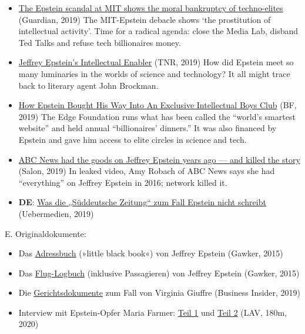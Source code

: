 \begin{itemize}
\tightlist
\item
  \href{https://www.theguardian.com/commentisfree/2019/sep/07/jeffrey-epstein-mit-funding-tech-intellectuals}{The
  Epstein scandal at MIT shows the moral bankruptcy of techno-elites}
  (Guardian, 2019) The MIT-Epstein debacle shows `the prostitution of
  intellectual activity'. Time for a radical agenda: close the Media
  Lab, disband Ted Talks and refuse tech billionaires money.
\item
  \href{https://newrepublic.com/article/154826/jeffrey-epsteins-intellectual-enabler}{Jeffrey
  Epstein's Intellectual Enabler} (TNR, 2019) How did Epstein meet so
  many luminaries in the worlds of science and technology? It all might
  trace back to literary agent John Brockman.
\item
  \href{https://www.buzzfeednews.com/article/peteraldhous/jeffrey-epstein-john-brockman-edge-foundation}{How
  Epstein Bought His Way Into An Exclusive Intellectual Boys Club} (BF,
  2019) The Edge Foundation runs what has been called the ``world's
  smartest website'' and held annual ``billionaires' dinners.'' It was
  also financed by Epstein and gave him access to elite circles in
  science and tech.
\item
  \href{https://www.salon.com/2019/12/15/abc-news-had-the-goods-on-jeffrey-epstein-years-ago-and-killed-the-story/}{ABC
  News had the goods on Jeffrey Epstein years ago --- and killed the
  story} (Salon, 2019) In leaked video, Amy Robach of ABC News says she
  had ``everything'' on Jeffrey Epstein in 2016; network killed it.
\item
  \textbf{DE}:
  \href{https://uebermedien.de/44393/was-die-sueddeutsche-zeitung-zum-fall-jeffrey-epstein-nicht-schreibt/}{Was
  die „Süddeutsche Zeitung`` zum Fall Epstein nicht schreibt}
  (Uebermedien, 2019)
\end{itemize}

E. Originaldokumente:

\begin{itemize}
\tightlist
\item
  Das
  \href{https://gawker.com/here-is-pedophile-billionaire-jeffrey-epsteins-little-b-1681383992}{Adressbuch}
  (»little black book«) von Jeffrey Epstein (Gawker, 2015)
\item
  Das
  \href{https://gawker.com/flight-logs-put-clinton-dershowitz-on-pedophile-billio-1681039971}{Flug-Logbuch}
  (inklusive Passagieren) von Jeffrey Epstein (Gawker, 2015)
\item
  Die \href{https://swprs.org/das-giuffre-dossier/}{Gerichtsdokumente}
  zum Fall von Virginia Giuffre (Business Insider, 2019)
\item
  Interview mit Epstein-Opfer Maria Farmer:
  \href{https://www.thelastamericanvagabond.com/interviews/epstein-victim-maria-farmer-speaks-with-whitney-webb-full-phone-call-part-1/}{Teil
  1} und
  \href{https://www.thelastamericanvagabond.com/top-news/epstein-victim-maria-farmer-speaks-with-whitney-webb-full-phone-call-part-2/}{Teil
  2} (LAV, 180m, 2020)
\end{itemize}

